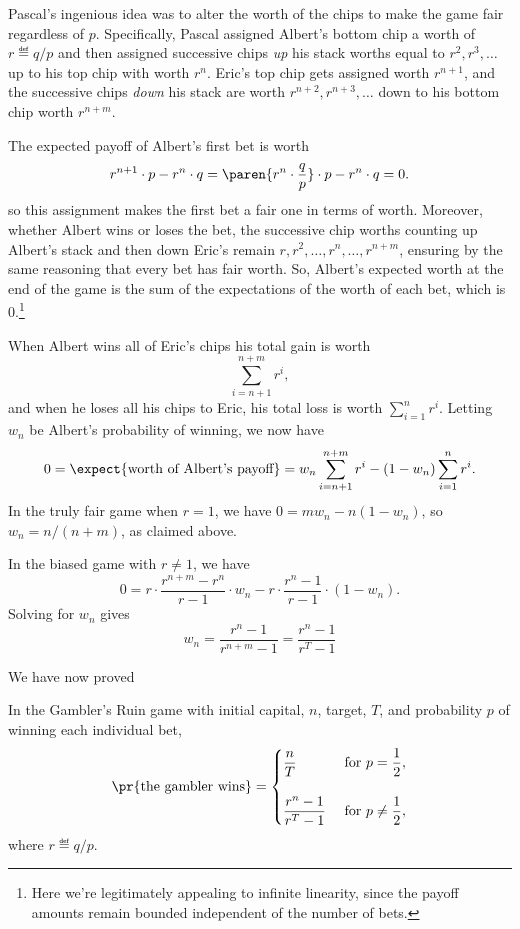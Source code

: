 Pascal's ingenious idea was to alter the worth of the chips to make
the game fair regardless of $p$.  Specifically, Pascal assigned
Albert's bottom chip a worth of $r \eqdef q/p$ and then assigned
successive chips \emph{up} his stack worths equal to
$r^{2},r^{3},\dots$ up to his top chip with worth $r^n$.  Eric's top
chip gets assigned worth $r^{n+1}$, and the successive chips
\emph{down} his stack are worth $r^{n+2},r^{n+3},\dots$ down to
his bottom chip worth $r^{n+m}$.

The expected payoff of Albert's first bet is worth
\[
r^{n+1}\cdot p - r^n\cdot q
   = \paren{r^n \cdot \frac{q}{p}} \cdot p - r^n\cdot q = 0.
\]
so this assignment makes the first bet a fair one in terms of worth.
Moreover, whether Albert wins or loses the bet, the successive chip
worths counting up Albert's stack and then down Eric's remain
$r,r^2,\dots,r^n,\dots,r^{n+m}$, ensuring by the same reasoning that
every bet has fair worth.  So, Albert's expected worth at the end of
the game is the sum of the expectations of the worth of each bet,
which is 0.\footnote{Here we're legitimately appealing to infinite
  linearity, since the payoff amounts remain bounded independent of
  the number of bets.}

When Albert wins all of Eric's chips his total gain is worth
\[
\sum_{i=n+1}^{n+m} r^i,
\]
and when he loses all his chips to Eric, his total loss is worth
$\sum_{i=1}^n r^i$.  Letting $w_n$ be Albert's probability of winning,
we now have
\[
0 = \expect{\text{worth of Albert's payoff}} =
 w_n \sum_{i=n+1}^{n+m} r^i - (1-w_n)\sum_{i=1}^n r^i.
\]
In the truly fair game when $r=1$, we have $0 = mw_n - n(1-w_n)$, so
$w_n = n/(n+m)$, as claimed above.

In the biased game with $r\neq 1$, we have
\[
0 =   r \cdot \frac{r^{n+m} - r^{n}}{r-1} \cdot w_n
        - r \cdot \frac{r^{n}-1}{r-1}\cdot (1-w_n).
\]
Solving for $w_n$ gives
\begin{equation}\label{LN12:wnsol}
w_n = \frac{r^n-1}{r^{n+m} -1} = \frac{r^n-1}{r^{T} -1}
\end{equation}

We have now proved
\begin{theorem}\label{thm:gamblerruin}
  In the Gambler's Ruin game with initial capital, $n$, target, $T$,
  and probability $p$ of winning each individual bet,
\begin{equation}\label{eq:gamblerruin}
\pr{\text{the gambler wins}} =
\begin{cases}
 \dfrac{n}{T} & \text{ for } p = \dfrac{1}{2},\\
              &   \\
 \dfrac{r^n-1}{r^{T} -1} & \text{ for } p \neq \dfrac{1}{2},
\end{cases}
\end{equation}
where $r \eqdef q/p$.
\end{theorem}

